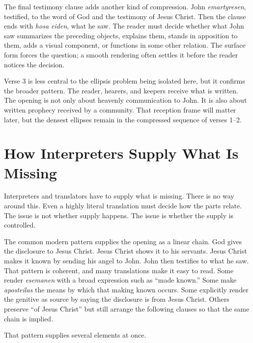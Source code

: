 The final testimony clause adds another kind of compression. John \textit{emartyresen}, testified, to the word of God and the testimony of Jesus Christ. Then the clause ends with \textit{hosa eiden}, what he saw. The reader must decide whether what John saw summarizes the preceding objects, explains them, stands in apposition to them, adds a visual component, or functions in some other relation. The surface form forces the question; a smooth rendering often settles it before the reader notices the decision.

Verse 3 is less central to the ellipsis problem being isolated here, but it confirms the broader pattern. The reader, hearers, and keepers receive what is written. The opening is not only about heavenly communication to John. It is also about written prophecy received by a community. That reception frame will matter later, but the densest ellipses remain in the compressed sequence of verses 1--2.

\section{How Interpreters Supply What Is Missing}

Interpreters and translators have to supply what is missing. There is no way around this. Even a highly literal translation must decide how the parts relate. The issue is not whether supply happens. The issue is whether the supply is controlled.

The common modern pattern supplies the opening as a linear chain. God gives the disclosure to Jesus Christ. Jesus Christ shows it to his servants. Jesus Christ makes it known by sending his angel to John. John then testifies to what he saw. That pattern is coherent, and many translations make it easy to read. Some render \textit{esemanen} with a broad expression such as ``made known.'' Some make \textit{aposteilas} the means by which that making known occurs. Some explicitly render the genitive as source by saying the disclosure is from Jesus Christ. Others preserve ``of Jesus Christ'' but still arrange the following clauses so that the same chain is implied.

That pattern supplies several elements at once.

